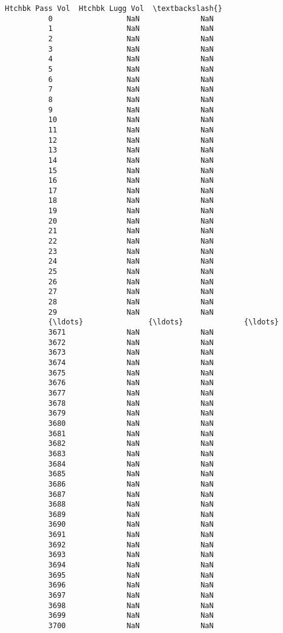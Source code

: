\documentclass[11pt]{article}
\begin{document}
\begin{Verbatim}[commandchars=\\\{\}]
                Htchbk Pass Vol  Htchbk Lugg Vol  \textbackslash{}
          0                 NaN              NaN   
          1                 NaN              NaN   
          2                 NaN              NaN   
          3                 NaN              NaN   
          4                 NaN              NaN   
          5                 NaN              NaN   
          6                 NaN              NaN   
          7                 NaN              NaN   
          8                 NaN              NaN   
          9                 NaN              NaN   
          10                NaN              NaN   
          11                NaN              NaN   
          12                NaN              NaN   
          13                NaN              NaN   
          14                NaN              NaN   
          15                NaN              NaN   
          16                NaN              NaN   
          17                NaN              NaN   
          18                NaN              NaN   
          19                NaN              NaN   
          20                NaN              NaN   
          21                NaN              NaN   
          22                NaN              NaN   
          23                NaN              NaN   
          24                NaN              NaN   
          25                NaN              NaN   
          26                NaN              NaN   
          27                NaN              NaN   
          28                NaN              NaN   
          29                NaN              NaN   
          {\ldots}               {\ldots}              {\ldots}   
          3671              NaN              NaN   
          3672              NaN              NaN   
          3673              NaN              NaN   
          3674              NaN              NaN   
          3675              NaN              NaN   
          3676              NaN              NaN   
          3677              NaN              NaN   
          3678              NaN              NaN   
          3679              NaN              NaN   
          3680              NaN              NaN   
          3681              NaN              NaN   
          3682              NaN              NaN   
          3683              NaN              NaN   
          3684              NaN              NaN   
          3685              NaN              NaN   
          3686              NaN              NaN   
          3687              NaN              NaN   
          3688              NaN              NaN   
          3689              NaN              NaN   
          3690              NaN              NaN   
          3691              NaN              NaN   
          3692              NaN              NaN   
          3693              NaN              NaN   
          3694              NaN              NaN   
          3695              NaN              NaN   
          3696              NaN              NaN   
          3697              NaN              NaN   
          3698              NaN              NaN   
          3699              NaN              NaN   
          3700              NaN              NaN   
          

\end{Verbatim}
\end{document}

